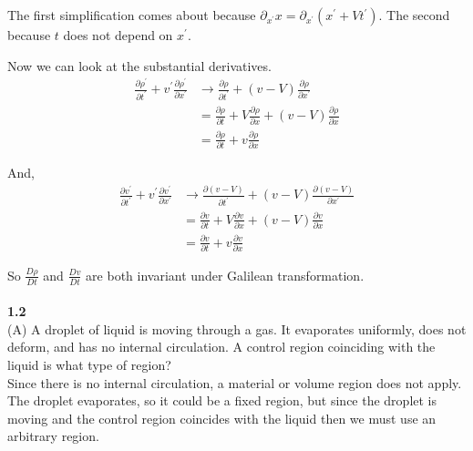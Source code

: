 The first simplification comes about because $\partial_{x^\prime} x = \partial_{x^\prime} \left( x^\prime + Vt^\prime\right)$.
The second because $t$ does not depend on $x^\prime$.


Now we can look at the substantial derivatives.
\begin{align*}
\frac{\partial \rho^\prime}{\partial t^\prime} + v^\prime \frac{\partial \rho^\prime}{\partial x^\prime}
    &\rightarrow \frac{\partial \rho}{\partial t^\prime} + (v-V) \frac{\partial \rho}{\partial x^\prime} \\
&= \frac{\partial \rho}{\partial t} + V \frac{\partial \rho}{\partial x}
    + (v-V) \frac{\partial \rho}{\partial x} \\
&= \frac{\partial \rho}{\partial t} + v \frac{\partial \rho}{\partial x}
\end{align*}



And,
\begin{align*}
\frac{\partial v^\prime}{\partial t^\prime} + v^\prime \frac{\partial v^\prime}{\partial x^\prime}
    &\rightarrow \frac{\partial (v-V)}{\partial t^\prime} + (v-V) \frac{\partial (v-V)}{\partial x^\prime} \\
&= \frac{\partial v}{\partial t} + V \frac{\partial v}{\partial x} +
    (v-V) \frac{\partial v}{\partial x} \\
&= \frac{\partial v}{\partial t} + v \frac{\partial v}{\partial x}
\end{align*}

So $\frac{D\rho}{Dt}$ and $\frac{Dv}{Dt}$ are both invariant under Galilean transformation.
\\~\\



\textbf{1.2}
\\

(A) A droplet of liquid is moving through a gas.
It evaporates uniformly, does not deform, and has no internal circulation.
A control region coinciding with the liquid is what type of region?
\\

Since there is no internal circulation, a material or volume region does not apply.
The droplet evaporates, so it could be a fixed region, but since the droplet is moving and the control region
coincides with the liquid then we must use an arbitrary region.
\\~\\


